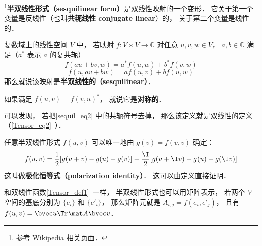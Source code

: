 
\begin{issues}
\issueDraft
\end{issues}

\footnote{参考 Wikipedia \href{https://en.wikipedia.org/wiki/Sesquilinear_form}{相关页面}．}\textbf{半双线性形式（sesquilinear form）}是双线性映射的一个变形． 它关于第一个变量是反线性（也叫\textbf{共轭线性 conjugate linear}）的， 关于第二个变量是线性的．
\begin{definition}{}\label{sequil_def1}
复数域上的线性空间 $V$ 中， 若映射 $f:V\times V\to \mathbb C$ 对任意 $u, v, w\in V$， $a,b\in \mathbb C$ 满足（$a^*$ 表示 $a$ 的复共轭）
\begin{equation}\label{sequil_eq2}
f(au+bv, w) = a^*f(u, w) + b^*f(v, w)
\end{equation}
\begin{equation}\label{sequil_eq1}
f(u, av+bw) = af(u, v) + bf(u, w)
\end{equation}
那么就说该映射是\textbf{半双线性的（sesquilinear）}．
\end{definition}
如果满足 $f(u, v) = f(v, u)^*$， 就说它是\textbf{对称的}．

可以发现， 若把\autoref{sequil_eq2} 中的共轭符号去掉， 那么该定义就是双线性的定义（\autoref{Tensor_eq2}~）．

任意半双线性形式 $f(u, v)$ 可以唯一地由 $g(v) = f(v, v)$ 确定：
\begin{equation}
f(u, v) =\frac{1}{2}[g(u+v)-g(u)-g(v)]
-\frac{\I}{2}[g(u+\I v)-g(u)-g(\I v)]
\end{equation}
这叫做\textbf{极化恒等式（polarization identity）}． 这可以由定义直接证明．

和双线性函数\autoref{Tensor_def1}~一样， 半双线性形式也可以用矩阵表示， 若两个 $V$ 空间的基底分别为 $\{e_i\}$ 和 $\{e'_i\}$， 那么矩阵元就是 $A_{i,j} = f(e_i, e'_j)$， 且有 $f(u, v) = \bvec u\Tr \mat A \bvec v$．




